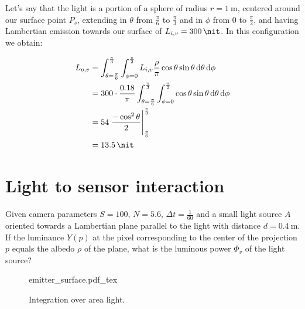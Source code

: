 Let's say that the light is a portion of a sphere of radius $r = \SI{1}{\meter}$, centered
around our surface point $P_s$, extending in $\theta$ from $\frac\pi6$ to $\frac\pi3$ and in
$\phi$ from $0$ to $\frac\pi2$, and having Lambertian emission towards our
surface of $L_{i,v} = \SI{300}{\nit}$.
In this configuration we obtain:

\begin{align*}
L_{o,v} &= \int_{\theta = \frac\pi 6}^\frac\pi 3 \int _{\phi = 0}^\frac\pi
2 L_{i,v} \frac\rho\pi \cos\theta \sin\theta \d\theta \d\phi \\
             &= 300\cdot \frac{0.18}\pi \int_{\theta = \frac\pi 6}^\frac\pi 3 \int _{\phi = 0}^\frac\pi 2 \cos\theta \sin\theta \d\theta \d\phi \\
             &= 54 \left.\frac{-\cos^2\theta}{2}\right|_{\frac\pi 6}^\frac\pi 3 \\
             &= \SI{13.5}{\nit}
\end{align*}

\section{Light to sensor interaction}

Given camera parameters $S=100$, $N=5.6$, $\Delta t = \frac 1 {60}$
and a small light source $A$ oriented towards a
Lambertian plane parallel to the light with distance
$d = \SI{0.4}{\meter}$. If the luminance $Y(p)$ at the pixel corresponding
to the center of the projection $p$ equals the albedo $\rho$ of the plane,
what is the luminous power $\Phi_v$ of the light source?
\begin{figure}[t]
    \centering
    \def\svgwidth{0.9\linewidth}
    {emitter_surface.pdf_tex}
    \caption{Integration over area light.}
\end{figure}


